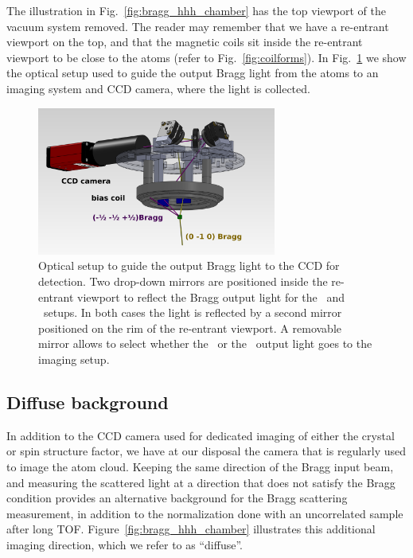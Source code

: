 The illustration in Fig.~\ref{fig:bragg_hhh_chamber} has the top viewport of
the vacuum system removed.  The reader may remember that we have a re-entrant
viewport on the top, and that the magnetic coils sit inside the re-entrant
viewport to be close to the atoms (refer to Fig.~\ref{fig:coilforms}).  In
Fig.~\ref{fig:bragg-outputs} we show the optical setup used to guide the output
Bragg light from the atoms to an imaging system and CCD camera, where the light
is collected.    
\begin{figure}
    \centering
\includegraphics[width=0.7\textwidth]{../figures/braggscatt/bragg_initial_setup_updated.png}
\caption{\small  Optical setup to guide the output Bragg light to the CCD for
detection.  Two drop-down mirrors are positioned inside the re-entrant viewport
to reflect the Bragg output light for the \zoz\ and \hhh\ setups. In both cases
the light is reflected by a second mirror positioned on the rim of the
re-entrant viewport.  A removable mirror allows to select whether the \zoz\ or
the \hhh\ output light goes to the imaging setup.  }
\label{fig:bragg-outputs}
\end{figure}

\subsection{Diffuse background} 

In addition to the CCD camera used for dedicated imaging of either the crystal
or spin structure factor,  we have at our disposal the camera that is regularly
used to image the atom cloud.    Keeping the same direction of the Bragg input
beam, and measuring the scattered light at a direction that does not satisfy
the Bragg condition provides an alternative background for the Bragg scattering
measurement, in addition to the normalization done with an uncorrelated sample
after long TOF. Figure~\ref{fig:bragg_hhh_chamber} illustrates this additional
imaging direction, which we refer to as ``diffuse''.


